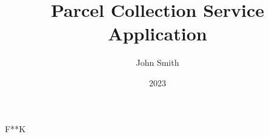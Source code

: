 \documentclass[
]{elteikthesis}[2023/04/10]
\title{Parcel Collection Service Application } %
\date{2023} %
\author{John Smith}
\affiliation{Assistant Lecturer} %
\begin{document}
F**K
\end{document}
